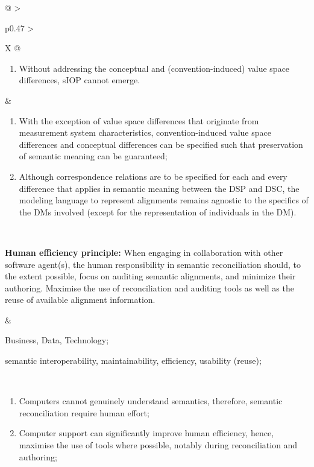 \begin{xltabular}[l]{\linewidth}{@{} >{\small\raggedright\arraybackslash}p{0.47\linewidth} >{\small\raggedright\arraybackslash}X @{}}
\begin{enumerate}[left=6pt, nosep]
\begin{enumerate}
    \item distinctions between ordinal, interval and ratio scales: then the DSC is allowed to make comparisons between incomparable values, resulting in invalid pragmatic meaning;
  \end{enumerate}
  \item Without addressing the conceptual and (convention-induced) value space differences, sIOP cannot emerge.
\end{enumerate}
&
\begin{enumerate}[left=10pt, nosep]
  \item With the exception of value space differences that originate from measurement system characteristics, convention-induced value space differences and conceptual differences can be specified such that preservation of semantic meaning can be guaranteed;
  \item Although correspondence relations are to be specified for each and every difference that applies in semantic meaning between the DSP and DSC, the modeling language to represent alignments remains agnostic to the specifics of the DMs involved (except for the representation of individuals in the DM).
\end{enumerate} \\
%
%
%
\begin{mmdp}\label{dp:he}{\bfseries Human efficiency principle:}
\quad When engaging in collaboration with other software agent(s), the human responsibility in semantic reconciliation should, to the extent possible, focus on auditing semantic alignments, and minimize their authoring. Maximise the use of reconciliation and auditing tools as well as the reuse of available alignment information.\end{mmdp}
&
\begin{description}[labelwidth=3.7cm,leftmargin=3.7cm+1ex,nosep,topsep=2ex,labelsep=1ex,font=\bfseries]
\item[Type of information:] Business, Data, Technology;
\item[Quality attributes:] semantic interoperability, maintainability, efficiency, usability (reuse);
\end{description}
\\
\begin{enumerate}[left=6pt, nosep]
  \item Computers cannot genuinely understand semantics, therefore, semantic reconciliation require human effort;
  \item Computer support can significantly improve human efficiency, hence, maximise the use of tools where possible, notably during reconciliation and authoring;

\end{enumerate}
\end{xltabular}
